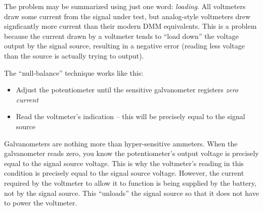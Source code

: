 





The problem may be summarized using just one word: {\it loading}.  All voltmeters draw some current from the signal under test, but analog-style voltmeters drew signficantly more current than their modern DMM equivalents.  This is a problem because the current drawn by a voltmeter tends to ``load down'' the voltage output by the signal source, resulting in a negative error (reading less voltage than the source is actually trying to output).

\vskip 10pt

The ``null-balance'' technique works like this:

\begin{itemize}
\item{} Adjust the potentiometer until the sensitive galvanometer registers {\it zero current}
\item{} Read the voltmeter's indication -- this will be precisely equal to the signal source
\end{itemize}

Galvanometers are nothing more than hyper-sensitive ammeters.  When the galvanometer reads zero, you know the potentiometer's output voltage is precisely equal to the signal source voltage.  This is why the voltmeter's reading in this condition is precisely equal to the signal source voltage.  However, the current required by the voltmeter to allow it to function is being supplied by the battery, not by the signal source.  This ``unloads'' the signal source so that it does not have to power the voltmeter.











